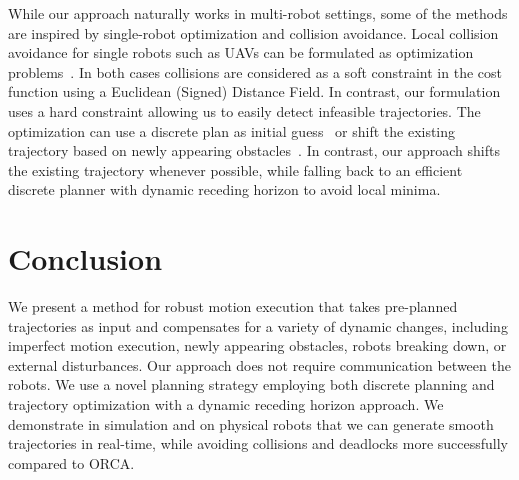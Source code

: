 \documentclass{svproc}
\begin{document}
While our approach naturally works in multi-robot settings, some of the methods are inspired by single-robot optimization and collision avoidance.
Local collision avoidance for single robots such as UAVs can be formulated as optimization problems~\cite{replanning-eth,replanning-usenko}.
In both cases collisions are considered as a soft constraint in the cost function using a Euclidean (Signed) Distance Field.
In contrast, our formulation uses a hard constraint allowing us to easily detect infeasible trajectories.
The optimization can use a discrete plan as initial guess~\cite{replanning-eth} or shift the existing trajectory based on newly appearing obstacles~\cite{replanning-usenko}.
In contrast, our approach shifts the existing trajectory whenever possible, while falling back to an efficient discrete planner with dynamic receding horizon to avoid local minima.








\section{Conclusion}

We present a method for robust motion execution that takes pre-planned trajectories as input and compensates for a variety of dynamic changes, including imperfect motion execution, newly appearing obstacles, robots breaking down, or external disturbances.
Our approach does not require communication between the robots.
We use a novel planning strategy employing both discrete planning and trajectory optimization with a dynamic receding horizon approach.
We demonstrate in simulation and on physical robots that we can generate smooth trajectories in real-time, while avoiding collisions and deadlocks more successfully compared to ORCA.
\end{document}
